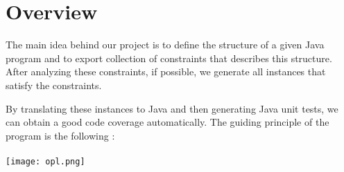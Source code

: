 \section{Overview}
\label{sec:Overview}
The main idea behind our project is to define the structure of a given Java program and to export collection of constraints that describes this structure. After analyzing these constraints, if possible, we generate all instances that satisfy the constraints.

By translating these instances to Java and then generating Java unit tests, we can obtain a good code coverage automatically. The guiding principle of the program is the following :\\~\\
\texttt{[image: opl.png]}